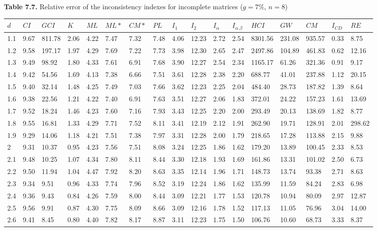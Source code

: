 \newpage
\textbf{Table 7.7.} Relative error of the inconsistency indexes for incomplete matrices ($g=7\%$, $n=8$)
\begin{adjustbox}{angle=90}
  \begin{center}
    \begin{tabular}{|l|llllllllllllllll|}
      \hline $d$ &
$CI$&$	\textit{GCI}$&$K$&$ML$&$ML*$&$CM*$&$PL$&$I_1$&$I_2$&$I_{\alpha}$&$I_{\alpha.\beta}$&$HCI$&$GW$&$CM$&$I_{CD}$&$RE$\\ \hline \hline
1.1&9.67&811.78&2.06&4.22&7.47&7.32&7.48&4.06&12.23&2.72&2.54&8301.56&231.08&935.57&0.33&8.75  \\ 
1.2&9.58&197.17&1.97&4.29&7.69&7.22&7.73&3.98&12.30&2.65&2.47&2497.86&104.89&461.83&0.62&12.16  \\ 
1.3&9.49&98.92&1.80&4.33&7.61&6.91&7.68&3.90&12.27&2.54&2.34&1165.17&61.26&321.36&0.91&9.17  \\ 
1.4&9.42&54.56&1.69&4.13&7.38&6.66&7.51&3.61&12.28&2.38&2.20&688.77&41.01&237.88&1.12&20.15  \\ 
1.5&9.40&32.14&1.48&4.25&7.49&7.03&7.66&3.62&12.23&2.25&2.04&484.40&28.73&187.82&1.39&8.64  \\ 
1.6&9.38&22.56&1.21&4.22&7.40&6.91&7.63&3.51&12.27&2.06&1.83&372.01&24.22&157.23&1.61&13.69  \\ 
1.7&9.52&18.24&1.46&4.23&7.60&7.16&7.93&3.43&12.25&2.20&2.00&293.49&20.13&138.69&1.82&8.77  \\ 
1.8&9.55&16.81&1.33&4.29&7.71&7.52&8.11&3.41&12.19&2.12&1.91&262.90&19.71&128.91&2.01&298.62  \\ 
1.9&9.29&14.06&1.18&4.21&7.51&7.38&7.97&3.31&12.28&2.00&1.79&218.65&17.28&113.88&2.15&9.88  \\ 
2&9.31&10.37&0.95&4.23&7.56&7.51&8.08&3.24&12.25&1.86&1.62&179.20&13.89&100.45&2.33&8.53  \\ 
2.1&9.48&10.25&1.07&4.34&7.80&8.11&8.44&3.30&12.18&1.93&1.69&161.86&13.31&101.02&2.50&6.73  \\ 
2.2&9.50&11.94&1.04&4.47&7.92&8.20&8.63&3.35&12.14&1.96&1.71&148.73&13.74&93.38&2.71&8.63  \\ 
2.3&9.34&9.51&0.96&4.33&7.74&7.96&8.52&3.19&12.24&1.86&1.62&135.99&11.59&84.24&2.83&6.98  \\ 
2.4&9.36&9.43&0.84&4.26&7.59&8.00&8.44&3.09&12.21&1.77&1.53&120.78&10.94&80.09&2.97&12.87  \\ 
2.5&9.56&9.91&0.87&4.30&7.75&8.09&8.66&3.09&12.16&1.78&1.52&117.13&11.05&76.96&3.04&14.00  \\ 
2.6&9.41&8.45&0.80&4.40&7.82&8.17&8.87&3.11&12.23&1.75&1.50&106.76&10.60&68.73&3.33&8.37  \\ 

\end{tabular}
\end{center}
\end{adjustbox}
